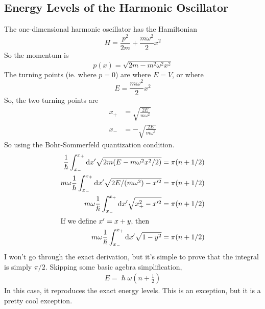\documentclass[a4paper]{article}
\begin{document}
\subsection{Energy Levels of the Harmonic Oscillator}
The one-dimensional harmonic oscillator has the Hamiltonian
\[
	H = \frac{p^2}{2m} + \frac{m\omega^2}{2}x^2
\]
So the momentum is
\[
	p(x) = \sqrt{2m - m^2\omega^2x^2}
\]
The turning points (ie. where $p=0$) are where $E=V$, or where
\[
	E = \frac{m\omega^2}{2}x^2
\]
So, the two turning points are
\begin{align*}
	x_+ &= \sqrt{\frac{2E}{m\omega^2}}\\
	x_- &= -\sqrt{\frac{2E}{m\omega^2}}
\end{align*}
So using the Bohr-Sommerfeld quantization condition.
\begin{align*}
	\frac{1}{\hslash}\int_{x_-}^{x_+} \mathrm{d} x'
	\sqrt{2m(E-m\omega^2x^2/2)} &= \pi(n+1/2)\\
	m\omega\frac{1}{\hslash}\int_{x_-}^{x_+} \mathrm{d} x'
	\sqrt{2E/(m\omega^2) - x'^2} &= \pi(n+1/2)\\
	m\omega\frac{1}{\hslash}\int_{x_-}^{x_+} \mathrm{d} x'
	\sqrt{x_+^2 - x'^2} &= \pi(n+1/2)\\
	\intertext{If we define $x'=x+y$, then}
	m\omega\frac{1}{\hslash}\int_{x_-}^{x_+} \mathrm{d} x'
	\sqrt{1-y^2} &= \pi(n+1/2)\\
\end{align*}
I won't go through the exact derivation, but it's simple to prove that
the integral is simply $\pi/2$. Skipping some basic agebra simplification,
\begin{align*}
	E = \hslash\omega\left(n+\frac{1}{2}\right)
\end{align*}
In this case, it reproduces the exact energy levels. This is an exception, but
it is a pretty cool exception.
\end{document}
